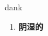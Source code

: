 
\begin{frame}
{\huge dank}
\begin{center}
\begin{enumerate}\Large
  \item \textbf{阴湿的}
\end{enumerate}
\end{center}
\end{frame}
